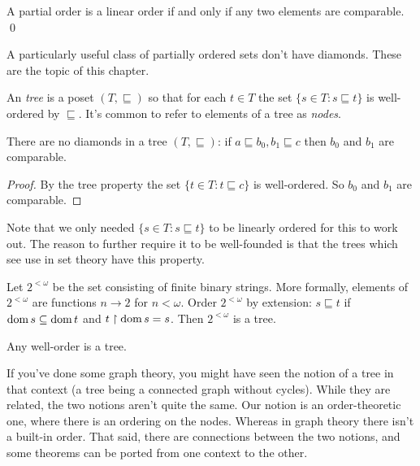 \documentclass[10pt]{amsart}
\begin{document}
\begin{observation}
A partial order is a linear order if and only if any two elements are comparable. \qed
\end{observation}

A particularly useful class of partially ordered sets don't have diamonds. These are the topic of this chapter.

\begin{definition}
An \emph{tree} is a poset $(T,\sqsubseteq)$ so that for each $t \in T$ the set $\{s \in T: s \sqsubseteq t\}$ is well-ordered by $\sqsubseteq$. It's common to refer to elements of a tree as \emph{nodes}.
\end{definition}

\begin{observation}
There are no diamonds in a tree $(T,\sqsubseteq)$: if $a \sqsubseteq b_0,b_1 \sqsubseteq c$ then $b_0$ and $b_1$ are comparable.
\end{observation}

\begin{proof}
By the tree property the set $\{t \in T : t \sqsubseteq c\}$ is well-ordered. So $b_0$ and $b_1$ are comparable.
\end{proof}

Note that we only needed $\{ s \in T : s \sqsubseteq t\}$ to be linearly ordered for this to work out. The reason to further require it to be well-founded is that the trees which see use in set theory have this property.

\begin{example}
Let $2^{<\omega}$ be the set consisting of finite binary strings. More formally, elements of $2^{<\omega}$ are functions $n \to 2$ for $n < \omega$. Order $2^{<\omega}$ by extension: $s \sqsubseteq t$ if $\operatorname{dom} s \subseteq \operatorname{dom} t$ and $t \upharpoonright \operatorname{dom} s = s$. Then $2^{<\omega}$ is a tree.
\end{example}

\begin{example}
Any well-order is a tree.
\end{example}


If you've done some graph theory, you might have seen the notion of a tree in that context (a tree being a connected graph without cycles). While they are related, the two notions aren't quite the same. Our notion is an order-theoretic one, where there is an ordering on the nodes. Whereas in graph theory there isn't a built-in order. That said, there are connections between the two notions, and some theorems can be ported from one context to the other.
\end{document}
